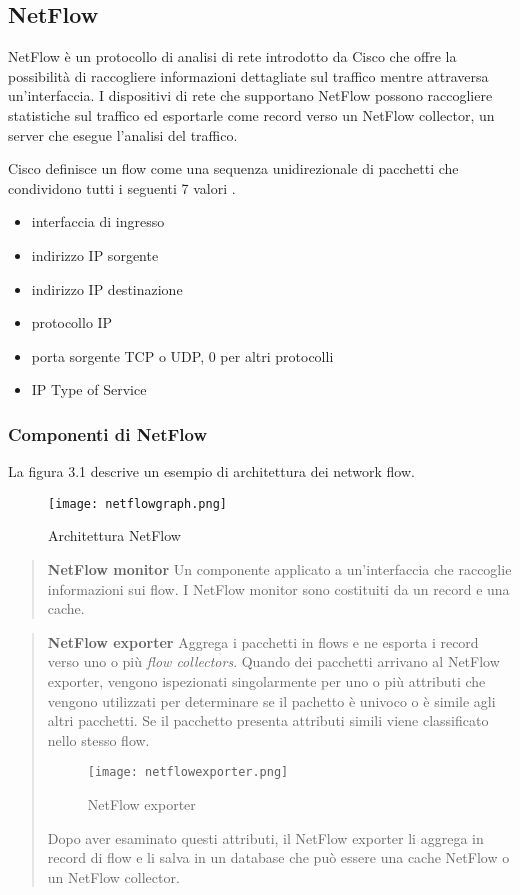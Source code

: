 \documentclass[../main.tex]{subfiles}
\begin{document}
\subsection{NetFlow}
NetFlow è un protocollo di analisi di rete introdotto da Cisco che offre la possibilità di raccogliere informazioni dettagliate sul traffico mentre attraversa un'interfaccia. I dispositivi di rete che supportano NetFlow possono raccogliere statistiche sul traffico ed esportarle come record verso un NetFlow collector, un server che esegue l'analisi del traffico.

Cisco definisce un flow come una sequenza unidirezionale di pacchetti che condividono tutti i seguenti 7 valori \cite{netflowDef}.

\begin{itemize}
				\item interfaccia di ingresso
				\item indirizzo IP sorgente
				\item indirizzo IP destinazione
				\item protocollo IP
				\item porta sorgente TCP o UDP, 0 per altri protocolli
				\item IP Type of Service
\end{itemize}


\subsubsection{Componenti di NetFlow}
La figura 3.1 descrive un esempio di architettura dei network flow. 

\begin{figure}[H]
\centering
\texttt{[image: netflowgraph.png]}
\caption{Architettura NetFlow}
\end{figure}

\begin{verse}
\textbf{NetFlow monitor}
Un componente applicato a un'interfaccia che raccoglie informazioni sui flow. I NetFlow monitor sono costituiti da un record e una cache.
\end{verse}

\begin{verse}
\textbf{NetFlow exporter}
Aggrega i pacchetti in flows e ne esporta i record verso uno o più \textit{flow collectors}.
Quando dei pacchetti arrivano al NetFlow exporter, vengono ispezionati singolarmente per uno o più attributi che vengono utilizzati per determinare se il pachetto è univoco o è simile agli altri pacchetti. Se il pacchetto presenta attributi simili viene classificato nello stesso flow.


\begin{figure}[H]
\centering
\texttt{[image: netflowexporter.png]}
\caption{NetFlow exporter}
\end{figure}

Dopo aver esaminato questi attributi, il NetFlow exporter li aggrega in record di flow e li salva in un database che può essere una cache NetFlow o un NetFlow collector.
\end{verse}
\end{document}

